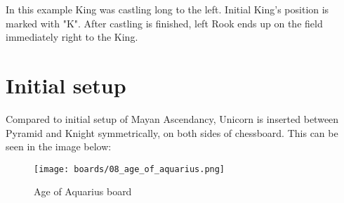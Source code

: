 In this example King was castling long to the left. Initial King's position is marked with "K".
After castling is finished, left Rook ends up on the field immediately right to the King.

\clearpage %

\section*{Initial setup}

Compared to initial setup of Mayan Ascendancy, Unicorn is inserted between Pyramid and Knight
symmetrically, on both sides of chessboard. This can be seen in the image below:

\noindent
\begin{figure}[h]
\texttt{[image: boards/08\_age\_of\_aquarius.png]}
\caption{Age of Aquarius board}
\label{fig:08_age_of_aquarius}
\end{figure}

\clearpage %
